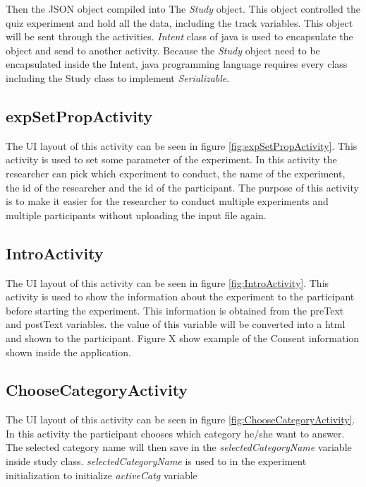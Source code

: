 Then the JSON object compiled into The \textit{Study} object. This object controlled the quiz experiment and hold all the data, including the track variables.
This object will be sent through the activities.
\textit{Intent} class of java is used to encapsulate the object and send to another activity.
Because the \textit{Study} object need to be encapsulated inside the Intent,
 java programming language requires every class including the Study class to implement \textit{Serializable}.

%

\subsection{expSetPropActivity}
The UI layout of this activity can be seen in figure \ref{fig:expSetPropActivity}.
This activity is used to set some parameter of the experiment. In this activity the researcher can pick which experiment to conduct, the name of the experiment,
the id of the researcher and the id of the participant.
The purpose of this activity is to make it easier for the researcher to conduct multiple experiments and multiple participants without uploading the input file again.

\subsection{IntroActivity}
The UI layout of this activity can be seen in figure \ref{fig:IntroActivity}.
This activity is used to show the information about the experiment to the participant before starting the experiment.
This information is obtained from the preText and postText variables. the value of this variable will be converted into a html and shown to the participant.
Figure X show example of the Consent information shown inside the application.

\subsection{ChooseCategoryActivity}
The UI layout of this activity can be seen in figure \ref{fig:ChooseCategoryActivity}.
In this activity the participant chooses which category he/she want to answer.
The selected category name will then save in the \textit{selectedCategoryName} variable inside study class.
\textit{selectedCategoryName} is used to in the experiment initialization to initialize \textit{activeCatg} variable


